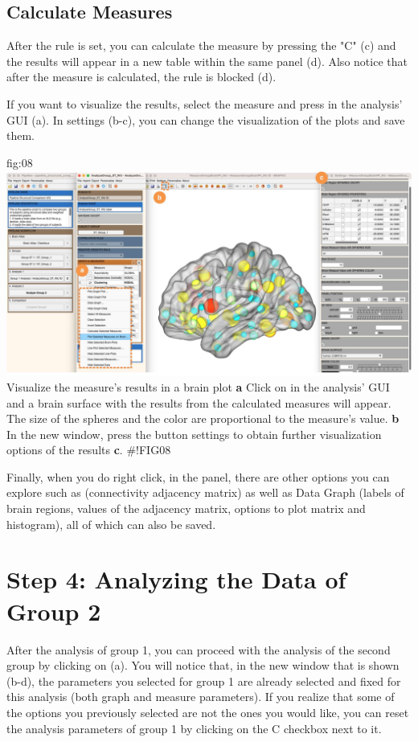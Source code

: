 \documentclass[justified]{tufte-handout}
\begin{document}
\subsection{Calculate Measures}
After the rule is set, you can calculate the measure by pressing the "C" (c) and the results will appear in a new table within the same panel (d). Also notice that after the measure is calculated, the rule is blocked (d).
 
If you want to visualize the results, select the measure and press  in the analysis' GUI (a). In settings (b-c), you can change the visualization of the plots and save them. 
 
{fig:08}
{\includegraphics{fig08.jpg}
}
{Visualize the measure's results in a brain plot}
{
	{\bf a} Click on  in the analysis' GUI and a brain surface with the results from the calculated measures will appear. The size of the spheres and the color are proportional to the measure's value.   
    {\bf b} In the new window, press the button settings to obtain further visualization options of the results {\bf c}. 
}
#!FIG08
 
 Finally, when you do right click, in the  panel, there are other options you can explore such as  (connectivity adjacency matrix) as well as Data Graph (labels of brain regions, values of the adjacency matrix, options to plot matrix and histogram), all of which can also be saved.
  
\section{Step 4: Analyzing the Data of Group 2}

After the analysis of group 1, you can proceed with the analysis of the second group by clicking on  (a). You will notice that, in the new window that is shown (b-d), the parameters you selected for group 1 are already selected and fixed for this analysis (both graph and measure parameters). If you realize that some of the options you previously selected are not the ones you would like, you can reset the analysis parameters of group 1 by clicking on the C checkbox next to it.
\end{document}
